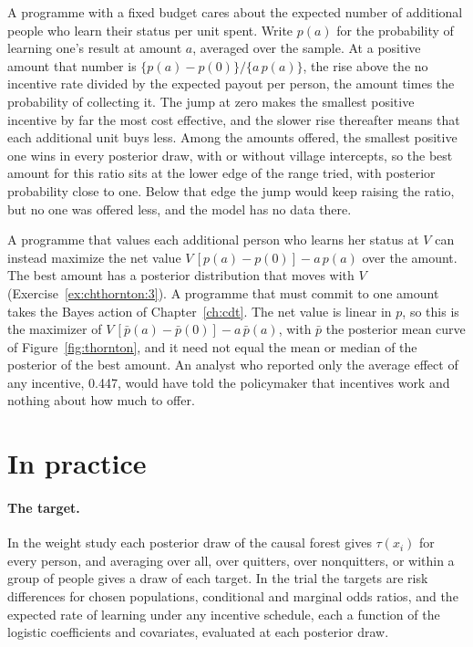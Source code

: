 A programme with a fixed budget cares about the expected number of additional people who learn their status per unit spent. Write $p(a)$ for the probability of learning one's result at amount $a$, averaged over the sample. At a positive amount that number is $\{p(a) - p(0)\}/\{a\,p(a)\}$, the rise above the no incentive rate divided by the expected payout per person, the amount times the probability of collecting it. The jump at zero makes the smallest positive incentive by far the most cost effective, and the slower rise thereafter means that each additional unit buys less. Among the amounts offered, the smallest positive one wins in every posterior draw, with or without village intercepts, so the best amount for this ratio sits at the lower edge of the range tried, with posterior probability close to one. Below that edge the jump would keep raising the ratio, but no one was offered less, and the model has no data there.

A programme that values each additional person who learns her status at $V$ can instead maximize the net value $V\,[p(a) - p(0)] - a\,p(a)$ over the amount. The best amount has a posterior distribution that moves with $V$ (Exercise~\ref{ex:chthornton:3}). A programme that must commit to one amount takes the Bayes action of Chapter~\ref{ch:cdt}. The net value is linear in $p$, so this is the maximizer of $V\,[\bar p(a) - \bar p(0)] - a\,\bar p(a)$, with $\bar p$ the posterior mean curve of Figure~\ref{fig:thornton}, and it need not equal the mean or median of the posterior of the best amount. An analyst who reported only the average effect of any incentive, 0.447, would have told the policymaker that incentives work and nothing about how much to offer.

\section{In practice}

\paragraph{The target.} In the weight study each posterior draw of the causal forest gives $\tau(x_i)$ for every person, and averaging over all, over quitters, over nonquitters, or within a group of people gives a draw of each target. In the trial the targets are risk differences for chosen populations, conditional and marginal odds ratios, and the expected rate of learning under any incentive schedule, each a function of the logistic coefficients and covariates, evaluated at each posterior draw.

